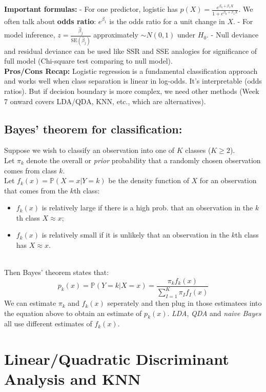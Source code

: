 \documentclass[11pt]{article}
\begin{document}
\textbf{Important formulas:} 
- For one predictor, logistic has $p(X) = \frac{e^{\beta_0+\beta_1 X}}{1+e^{\beta_0+\beta_1 X}}$. We often talk about \textbf{odds ratio}: $e^{\beta_1}$ is the odds ratio for a unit change in $X$. 
- For model inference, $z = \frac{\hat\beta_j}{\text{SE}(\hat\beta_j)}$ approximately $\sim N(0,1)$ under $H_0$.
- Null deviance and residual deviance can be used like SSR and SSE analogies for significance of full model (Chi-square test comparing to null model). \\

\noindent \textbf{Pros/Cons Recap:} Logistic regression is a fundamental classification approach and works well when class separation is linear in log-odds. It's interpretable (odds ratios). But if decision boundary is more complex, we need other methods (Week 7 onward covers LDA/QDA, KNN, etc., which are alternatives). \\

\subsection{Bayes' theorem for classification:}
\noindent Suppose we wish to classify an observation into one of $K$ classes ($K \geq 2$). \\

\noindent Let $\pi_{k}$ denote the overall or \textit{prior} probability that a randomly chosen observation comes from class $k$. \\

\noindent Let $f_k(x) = \mathbb{P}(X=x|Y=k)$ be the density function of $X$ for an observation that comes from the $k$th class:
\begin{itemize}
    \item $f_k(x)$ is relatively large if there is a high prob. that an observation in the $k$th class $X \approx x$;
    \item $f_k(x)$ is relatively small if it is unlikely that an observation in the $k$th class has $X \approx x$.
\end{itemize}
\phantom{i}
\\ \noindent Then Bayes' theorem states that:
$$p_k(x) = \mathbb{P}(Y=k|X=x) = \frac{\pi_k f_k(x)}{\sum_{I=1}^{K}{\pi_I f_I(x)}}$$
\noindent We can estimate $\pi_k$ and $f_k(x)$ seperately and then plug in those estimatees into the equation above to obtain an estimate of $p_k(x)$. \textit{LDA}, \textit{QDA} and \textit{naive Bayes} all use different estimates of $f_k(x)$.

\section{Linear/Quadratic Discriminant Analysis and KNN}
\end{document}
